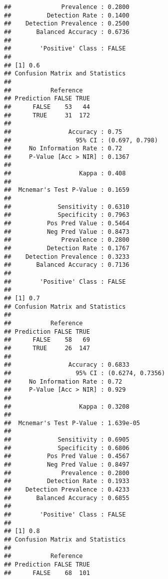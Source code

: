 \documentclass[]{article}
\begin{document}
\begin{verbatim}
##              Prevalence : 0.2800        
##          Detection Rate : 0.1400        
##    Detection Prevalence : 0.2500        
##       Balanced Accuracy : 0.6736        
##                                         
##        'Positive' Class : FALSE         
##                                         
## [1] 0.6
## Confusion Matrix and Statistics
## 
##           Reference
## Prediction FALSE TRUE
##      FALSE    53   44
##      TRUE     31  172
##                                         
##                Accuracy : 0.75          
##                  95% CI : (0.697, 0.798)
##     No Information Rate : 0.72          
##     P-Value [Acc > NIR] : 0.1367        
##                                         
##                   Kappa : 0.408         
##                                         
##  Mcnemar's Test P-Value : 0.1659        
##                                         
##             Sensitivity : 0.6310        
##             Specificity : 0.7963        
##          Pos Pred Value : 0.5464        
##          Neg Pred Value : 0.8473        
##              Prevalence : 0.2800        
##          Detection Rate : 0.1767        
##    Detection Prevalence : 0.3233        
##       Balanced Accuracy : 0.7136        
##                                         
##        'Positive' Class : FALSE         
##                                         
## [1] 0.7
## Confusion Matrix and Statistics
## 
##           Reference
## Prediction FALSE TRUE
##      FALSE    58   69
##      TRUE     26  147
##                                           
##                Accuracy : 0.6833          
##                  95% CI : (0.6274, 0.7356)
##     No Information Rate : 0.72            
##     P-Value [Acc > NIR] : 0.929           
##                                           
##                   Kappa : 0.3208          
##                                           
##  Mcnemar's Test P-Value : 1.639e-05       
##                                           
##             Sensitivity : 0.6905          
##             Specificity : 0.6806          
##          Pos Pred Value : 0.4567          
##          Neg Pred Value : 0.8497          
##              Prevalence : 0.2800          
##          Detection Rate : 0.1933          
##    Detection Prevalence : 0.4233          
##       Balanced Accuracy : 0.6855          
##                                           
##        'Positive' Class : FALSE           
##                                           
## [1] 0.8
## Confusion Matrix and Statistics
## 
##           Reference
## Prediction FALSE TRUE
##      FALSE    68  101

\end{verbatim}
\end{document}
